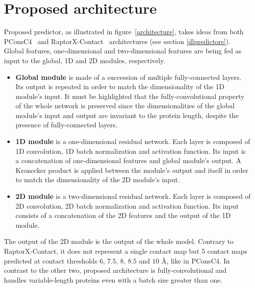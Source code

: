 \section{Proposed architecture}

  Proposed predictor, as illustrated in figure~\ref{architecture}, takes ideas from both PConsC4~\cite{Michel383133} and 
  RaptorX-Contact~\cite{RaptorX} architectures (see section \ref{dlpredictors}).
  Global features, one-dimensional and two-dimensional features are being fed
  as input to the global, 1D and 2D modules, respectively.
  \begin{itemize}
    \item \textbf{Global module} is made of a succession of multiple fully-connected layers.
        Its output is repeated in order to match the dimensionality of the 1D module's input.
        It must be highlighted that the fully-convolutional property of the whole network
        is preserved since the dimensionalities of the global module's input and output
        are invariant to the protein length, despite the presence of fully-connected layers.
    \item \textbf{1D module} is a one-dimensional residual network.
        Each layer is composed of 1D convolution, 1D batch normalization and activation function.
        Its input is a concatenation of one-dimensional features and global module's output.
        A Kronecker product is applied between the module's output and itself
        in order to match the dimensionality of the 2D module's input.
    \item \textbf{2D module} is a two-dimensional residual network.
        Each layer is composed of 2D convolution, 2D batch normalization and activation function.
        Its input consists of a concatenation of the 2D features and the output of the 1D module.
  \end{itemize}
  The output of the 2D module is the output of the whole model. Contrary to RaptorX-Contact,
  it does not represent a single contact map but 5 contact maps predicted at contact thresholds
  $6$, $7.5$, $8$, $8.5$ and $10$ \AA{}, like in PConsC4.
  In contrast to the other two, proposed architecture is fully-convolutional and handles variable-length
  proteins even with a batch size greater than one.

